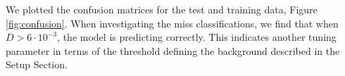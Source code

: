 \documentclass{article}
\begin{document}
%
We plotted the confusion matrices for the test and training data, Figure \ref{fig:confusion}. When investigating the miss classifications, we find that when $D > 6\cdot 10^{-3}$, the model is predicting correctly. This indicates another tuning parameter in terms of the threshold defining the background described in the Setup Section.


\end{document}
